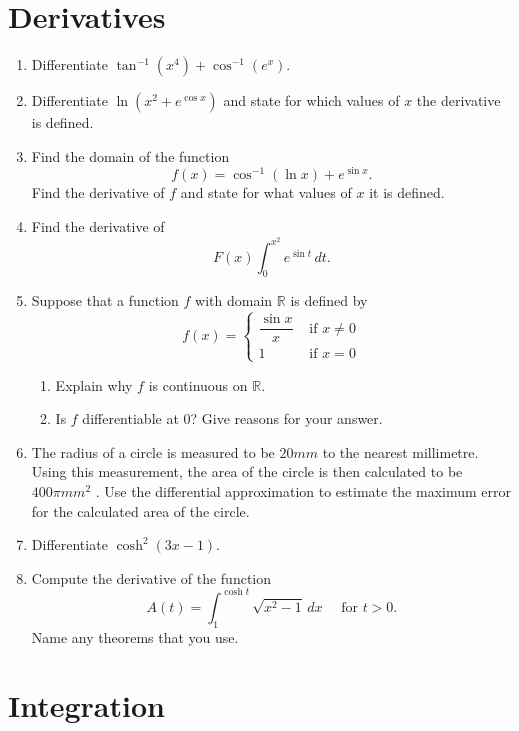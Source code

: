 \documentclass[10pt]{amsart}
\theoremstyle{plain}
\theoremstyle{definition}
\newcommand{\dx}{\,dx}
\newcommand{\RR}{\mathbb{R}}
\begin{document}
\section{Derivatives}
\begin{enumerate}
\item Differentiate $\tan^{-1}(x^4) + \cos^{-1}(e^x)$.

\item Differentiate $\ln (x^2 + e^{\cos x})$ and state for which values of $x$ the derivative is defined.

\item Find the domain of the function
\[ f (x) = \cos^{−1} (\ln x) + e^{\sin x} .\]
Find the derivative of $f$ and state for what values of $x$ it is defined.

\item Find the derivative of 
\[ F(x)\int_0^{x^2}e^{\sin t}\,dt. \]

\item Suppose that a function $f$ with domain $\mathbb{R}$ is defined by
\[f (x) = \left\lbrace\begin{array}{cl}
\dfrac{\sin x}{x} & \text{ if }x\neq 0\\
1 & \text{ if }x= 0
\end{array}\right.\]
\begin{enumerate}
\item Explain why $f$ is continuous on $\RR$.
\item Is $f$ differentiable at $0$? Give reasons for your answer.
\end{enumerate}

\medskip

\item The radius of a circle is measured to be $20 mm$ to the nearest millimetre. Using this
measurement, the area of the circle is then calculated to be $400\pi mm^2$ . Use the differential
approximation to estimate the maximum error for the calculated area of the circle.

\item Differentiate $\cosh^2(3x-1)$.

\item Compute the derivative of the function 
\[ A(t)=\int_1^{\cosh t}\sqrt{x^2-1}\dx \quad \text{ for }t>0. \] Name any theorems that you use.
\end{enumerate}

\section{Integration}
\end{document}
